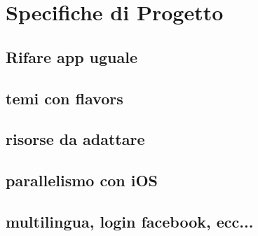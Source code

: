 \section{Specifiche di Progetto}

\subsection{Rifare app uguale}

\subsection{temi con flavors}

\subsection{risorse da adattare}

\subsection{parallelismo con iOS}

\subsection{multilingua, login facebook, ecc...}
\newpage
